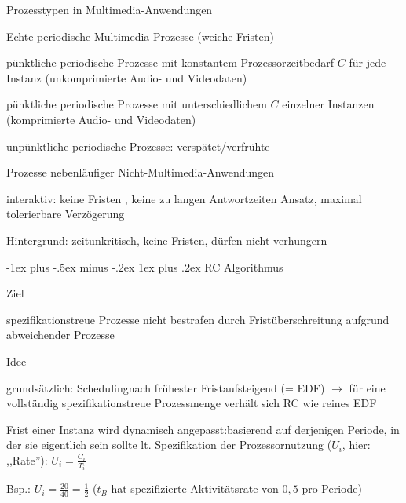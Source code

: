 \documentclass[a4paper]{article}
\makeatletter
\renewcommand{\subsubsection}{\@startsection{subsubsection}{3}{0mm}%
 {-1ex plus -.5ex minus -.2ex}%
 {1ex plus .2ex}%
 {\normalfont\small\bfseries}}
\makeatother
\begin{document}
\begin{multicols}{3}
    Prozesstypen in Multimedia-Anwendungen
    \begin{enumerate*}
        \item Echte periodische Multimedia-Prozesse (weiche Fristen) 
        \begin{enumerate*}
            \item pünktliche periodische Prozesse mit konstantem Prozessorzeitbedarf $C$ für jede Instanz (unkomprimierte Audio- und Videodaten)
            \item pünktliche periodische Prozesse mit unterschiedlichem $C$ einzelner Instanzen (komprimierte Audio- und Videodaten)
            \item unpünktliche periodische Prozesse: verspätet/verfrühte
        \end{enumerate*}
        \item Prozesse nebenläufiger Nicht-Multimedia-Anwendungen
        \begin{itemize*}
            \item interaktiv: keine Fristen , keine zu langen Antwortzeiten Ansatz, maximal tolerierbare Verzögerung
            \item Hintergrund: zeitunkritisch, keine Fristen, dürfen nicht verhungern
        \end{itemize*}
    \end{enumerate*}

    \subsubsection{RC Algorithmus}

    \begin{itemize*}
        \item Ziel
        \begin{itemize*}
            \item spezifikationstreue Prozesse nicht bestrafen durch Fristüberschreitung aufgrund abweichender Prozesse
        \end{itemize*}
        \item Idee
        \begin{itemize*}
            \item grundsätzlich: Schedulingnach frühester Fristaufsteigend (= EDF) $\rightarrow$ für eine vollständig spezifikationstreue Prozessmenge verhält sich RC wie reines EDF
            \item Frist einer Instanz wird dynamisch angepasst:basierend auf derjenigen Periode, in der sie eigentlich sein sollte lt. Spezifikation der Prozessornutzung ($U_i$, hier: ,,Rate''): $U_i=\frac{C_i}{T_i}$
            \item Bsp.: $U_i =\frac{20}{40}=\frac{1}{2}$ ($t_B$ hat spezifizierte Aktivitätsrate von $0,5$ pro Periode)
        \end{itemize*}
    \end{itemize*}



\end{multicols}
\end{document}
